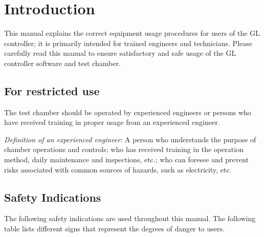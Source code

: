 \documentclass[11pt,twoside]{book}
\date{}
\begin{document}
\hypertarget{introduction}{%
\chapter{Introduction}

This manual explains the correct equipment usage procedures for users of
the GL controller; it is primarily intended for trained engineers and
technicians. Please carefully read this manual to ensure satisfactory
and safe usage of the GL controller software and test chamber.

\hypertarget{for-restricted-use}{%
\section{For restricted use}

The test chamber should be operated by experienced engineers or persons
who have received training in proper usage from an experienced engineer.

\emph{Definition of an experienced engineer}: A person who understands
the purpose of chamber operations and controls; who has received
training in the operation method, daily maintenance and inspections,
etc.; who can foresee and prevent risks associated with common sources
of hazards, such as electricity, etc.

\hypertarget{safety-indications}{%
\section{Safety Indications}

The following safety indications are used throughout this manual. The
following table lists different signs that represent the degrees of
danger to users.

}}}
\end{document}
